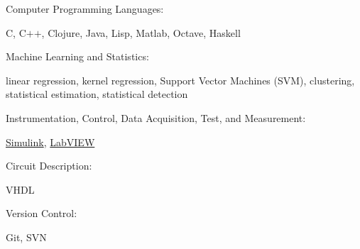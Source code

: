 \documentclass[10pt]{article}
\newcommand{\halfblankline}{\quad\vspace{-0.5\baselineskip}\pagebreak[3]}
\providecommand\Matlab{\textsc{Matlab}}
\begin{document}
Computer Programming Languages:
%
\begin{innerlist}
    \item C, C$+$$+$,  Clojure, Java, Lisp, Matlab, Octave, Haskell
\end{innerlist}

\halfblankline

Machine Learning and Statistics:
\begin{innerlist}
    \item linear regression, kernel regression, Support Vector Machines (SVM), clustering,
        statistical estimation, statistical detection
\end{innerlist}

\halfblankline

Instrumentation, Control, Data Acquisition, Test, and Measurement:
%
\begin{innerlist}
    \item 
        \href{http://www.mathworks.com/products/simulink/}{Simulink},
        \href{http://www.ni.com/}{LabVIEW}
\end{innerlist}

\halfblankline

Circuit Description:
\begin{innerlist}
    \item VHDL
\end{innerlist}

Version Control:
%
\begin{innerlist}
    \item Git, SVN
\end{innerlist}

\halfblankline

% 
% 
% 
% 
% 
% 
\end{document}
